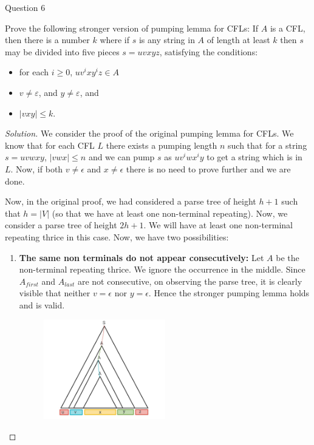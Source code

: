 \begin{solution}{Question 6}\label{ques:6}
    \begin{question}
    Prove the following stronger version of pumping lemma for CFLs: 
If $A$ is a CFL, then there is a number $k$ where if $s$ is any string in $A$ of length at least $k$ then $s$ may be divided into five pieces $s = uvxyz$, satisfying the conditions:
\begin{itemize}
    \item for each $i\geq 0$, $uv^ixy^iz \in A$
    \item $v \neq \varepsilon$, and $y \neq \varepsilon$, and
    \item $|vxy| \leq k$.
\end{itemize}
    \end{question}
    \tcblower{}
    \begin{proof}[Solution]
    We consider the proof of the original pumping lemma for CFLs. We know that for each CFL $L$ there exists a pumping length $n$ such that for a string $s = uvwxy$, $|vwx| \leq n$ and we can pump $s$ as $uv^iwx^iy$ to get a string which is in $L$. Now, if both $v \neq \epsilon$ and $x \neq \epsilon$ there is no need to prove further and we are done.\par
    Now, in the original proof, we had considered a parse tree of height $h + 1$ such that $h = |V|$ (so that we have at least one non-terminal repeating). Now, we consider a parse tree of height $2h + 1$. We will have at least one non-terminal repeating thrice in this case. Now, we have two possibilities:
    \begin{enumerate}
        \item \textbf{The same non terminals do not appear consecutively:} Let $A$ be the non-terminal repeating thrice. We ignore the occurrence in the middle. Since $A_{first}$ and $A_{last}$ are not consecutive, on observing the parse tree, it is clearly visible that neither $v = \epsilon$ nor $y = \epsilon$. Hence the stronger pumping lemma holds and is valid.
        \begin{figure}[H]
            \centering
            \includegraphics[width=0.5\textwidth]{case 1.jpeg}

\end{figure}
\end{enumerate}
\end{proof}
\end{solution}
